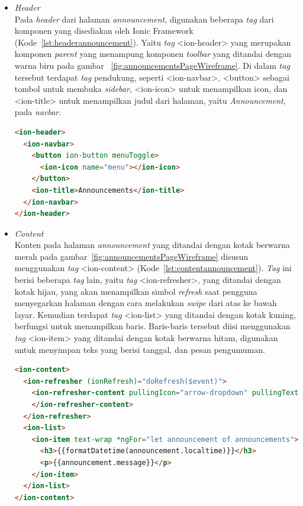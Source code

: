 \begin{itemize}
	\begin{itemize}
		\item \textit{Header} \\
		Pada \textit{header} dari halaman \textit{announcement}, digunakan beberapa \textit{tag} dari komponen yang disediakan oleh Ionic Framework (Kode~\ref{lst:headerannouncement}). Yaitu \textit{tag} <ion-header> yang merupakan komponen \textit{parent} yang menampung komponen \textit{toolbar} yang ditandai dengan warna biru pada gambar ~\ref{fig:announcementsPageWireframe}. Di dalam \textit{tag} tersebut terdapat \textit{tag} pendukung, seperti <ion-navbar>, <button> sebagai tombol untuk membuka \textit{sidebar}, <ion-icon> untuk menampilkan icon, dan <ion-title> untuk menampilkan judul dari halaman, yaitu \textit{Announcement}, pada \textit{navbar}.
		
\begin{lstlisting}[language=html, label={lst:headerannouncement}, caption=\textit{Header} pada halaman \textit{Annoncement}]
<ion-header>
  <ion-navbar>
    <button ion-button menuToggle>
      <ion-icon name="menu"></ion-icon>
    </button>
    <ion-title>Announcements</ion-title>
  </ion-navbar>
</ion-header>
\end{lstlisting} 

		\item \textit{Content} \\
		Konten pada halaman \textit{announcement} yang ditandai dengan kotak berwarna merah pada gambar~\ref{fig:announcementsPageWireframe} disusun menggunakan \textit{tag} <ion-content> (Kode~\ref{lst:contentannouncement}). \textit{Tag} ini berisi beberapa \textit{tag} lain, yaitu \textit{tag} <ion-refresher>, yang ditandai dengan kotak hijau, yang akan menampilkan simbol \textit{refresh} saat pengguna menyegarkan halaman dengan cara melakukan \textit{swipe} dari atas ke bawah layar. Kemudian terdapat \textit{tag} <ion-list> yang ditandai dengan kotak kuning, berfungsi untuk menampilkan baris. Baris-baris tersebut diisi menggunakan \textit{tag} <ion-item> yang ditandai dengan kotak berwarna hitam, digunakan untuk menyimpan teks yang berisi tanggal, dan pesan pengumuman.
		
\begin{lstlisting}[language=html, label={lst:contentannouncement}, caption=\textit{Content} pada halaman \textit{annoncement}]
<ion-content>
  <ion-refresher (ionRefresh)="doRefresh($event)">
    <ion-refresher-content pullingIcon="arrow-dropdown" pullingText="Pull to refresh" refreshingSpinner="circles" refreshingText="Refreshing...">
    </ion-refresher-content>
  </ion-refresher>
  <ion-list>
    <ion-item text-wrap *ngFor="let announcement of announcements">
      <h3>{{formatDatetime(announcement.localtime)}}</h3>
      <p>{{announcement.message}}</p>
    </ion-item>
  </ion-list>
</ion-content>
\end{lstlisting} 
	\end{itemize}


\end{itemize}
